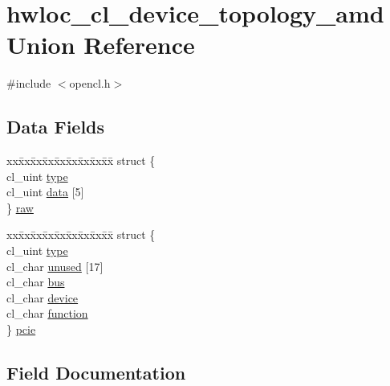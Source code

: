\hypertarget{a00322}{}\section{hwloc\+\_\+cl\+\_\+device\+\_\+topology\+\_\+amd Union Reference}
\label{a00322}


{\ttfamily \#include $<$opencl.\+h$>$}

\subsection*{Data Fields}
\begin{DoxyCompactItemize}
\item 
\begin{tabbing}
xx\=xx\=xx\=xx\=xx\=xx\=xx\=xx\=xx\=\kill
struct \{\\
\>cl\_uint \hyperlink{a00322_a8ec4ea89b862bb271845b48063f332b4}{type}\\
\>cl\_uint \hyperlink{a00322_afbd6b814607b06fc5b2f36ad14420398}{data} \mbox{[}5\mbox{]}\\
\} \hyperlink{a00322_ab3b58c076f09a6f66c3bef0288add64a}{raw}\\

\end{tabbing}\item 
\begin{tabbing}
xx\=xx\=xx\=xx\=xx\=xx\=xx\=xx\=xx\=\kill
struct \{\\
\>cl\_uint \hyperlink{a00322_a8ec4ea89b862bb271845b48063f332b4}{type}\\
\>cl\_char \hyperlink{a00322_ac8650d7eea96eef290481fee980d1d47}{unused} \mbox{[}17\mbox{]}\\
\>cl\_char \hyperlink{a00322_a4a23e3cc034b7ab105cab0e863dcab69}{bus}\\
\>cl\_char \hyperlink{a00322_a017033a953d71455b067007cabb92e9c}{device}\\
\>cl\_char \hyperlink{a00322_a77a67ac73cff98d330ef7258b240bac3}{function}\\
\} \hyperlink{a00322_abd362258740a00880a5598deb5a3e598}{pcie}\\

\end{tabbing}\end{DoxyCompactItemize}


\subsection{Field Documentation}
\mbox{\label{a00322_a4a23e3cc034b7ab105cab0e863dcab69}} 
